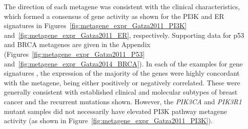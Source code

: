 The direction of each metagene was consistent with the clinical characteristics, which formed a consensus of gene activity as shown for the \gls{PI3K} and ER signatures \citep{Gatza2011} in Figures~\ref{fig:metagene_expr_Gatza2011_PI3K} and~\ref{fig:metagene_expr_Gatza2011_ER}, respectively.  Supporting data for p53 and BRCA metagenes \citep{Gatza2011, Gatza2014} are given in the Appendix (Figures~\ref{fig:metagene_expr_Gatza2011_P53} and~\ref{fig:metagene_expr_Gatza2014_BRCA}). In each of the examples for gene signatures%
, the expression of the majority of the genes were highly concordant with the metagene, being either positively or negatively correlated. These were generally consistent with established clinical and molecular subtypes of breast cancer and the recurrent mutations shown. However, the \textit{PIK3CA} and \textit{PIK3R1} mutant samples did not necessarily have elevated PI3K pathway metagene activity (as shown in Figure~\ref{fig:metagene_expr_Gatza2011_PI3K}).  


